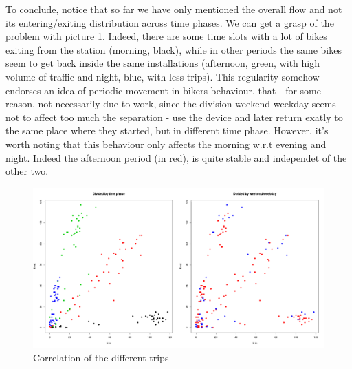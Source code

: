 \documentclass[11pt,twoside]{report}
\begin{document}
To conclude, notice that so far we have only mentioned the overall flow and not its entering/exiting distribution across time phases. We can get a grasp of the problem with picture \ref{fig:cp}. Indeed, there are some time slots with a lot of bikes exiting from the station (morning, black), while in other periods the same bikes seem to get back inside the same installations (afternoon, green, with high volume of traffic and night, blue, with less trips). This regularity somehow endorses an idea of periodic movement in bikers behaviour, that - for some reason, not necessarily due to work, since the division weekend-weekday seems not to affect too much the separation - use the device and later return exatly to the same place where they started, but in  different time phase. However, it's worth noting that this behaviour only affects the morning w.r.t evening and night. Indeed the afternoon period (in red), is quite stable and independet of the other two.

\begin{figure}[H]
	\centering
	\includegraphics[width=150 mm]{pictures/correlation_color.png}
	\caption{Correlation of the different trips}
	\label{fig:cp}
\end{figure}
\end{document}

